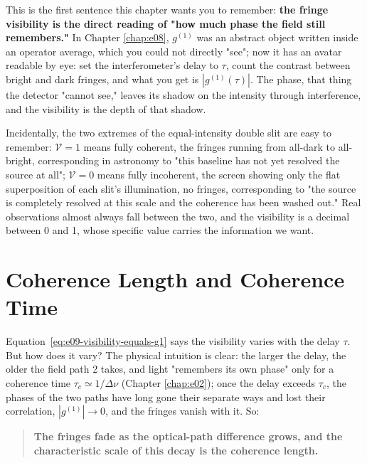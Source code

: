 This is the first sentence this chapter wants you to remember: \textbf{the fringe visibility is the direct reading of "how much phase the field still remembers."} In Chapter \ref{chap:e08}, \(g^{(1)}\) was an abstract object written inside an operator average, which you could not directly "see"; now it has an avatar readable by eye: set the interferometer's delay to \(\tau\), count the contrast between bright and dark fringes, and what you get is \(|g^{(1)}(\tau)|\). The phase, that thing the detector "cannot see," leaves its shadow on the intensity through interference, and the visibility is the depth of that shadow.

Incidentally, the two extremes of the equal-intensity double slit are easy to remember: \(\mathcal V=1\) means fully coherent, the fringes running from all-dark to all-bright, corresponding in astronomy to "this baseline has not yet resolved the source at all"; \(\mathcal V=0\) means fully incoherent, the screen showing only the flat superposition of each slit's illumination, no fringes, corresponding to "the source is completely resolved at this scale and the coherence has been washed out." Real observations almost always fall between the two, and the visibility is a decimal between 0 and 1, whose specific value carries the information we want.

\section{Coherence Length and Coherence Time}
\label{sec:e09-coherence-length}

Equation~\eqref{eq:e09-visibility-equals-g1} says the visibility varies with the delay \(\tau\). But how does it vary? The physical intuition is clear: the larger the delay, the older the field path 2 takes, and light "remembers its own phase" only for a coherence time \(\tau_c\simeq1/\Delta\nu\) (Chapter \ref{chap:e02}); once the delay exceeds \(\tau_c\), the phases of the two paths have long gone their separate ways and lost their correlation, \(|g^{(1)}|\to0\), and the fringes vanish with it. So:

\begin{quote}
\textbf{The fringes fade as the optical-path difference grows, and the characteristic scale of this decay is the coherence length.}
\end{quote}


